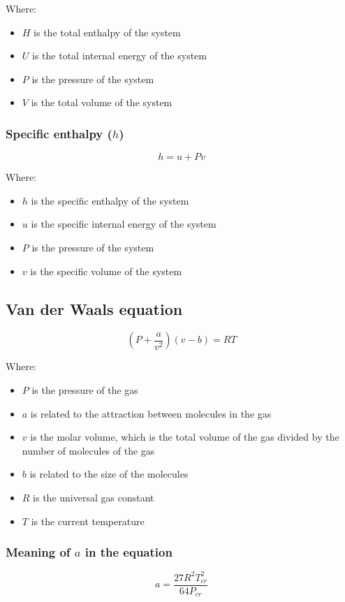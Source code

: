 \documentclass[11pt]{article}
\begin{document}
Where:
\begin{itemize}
\item \(H\) is the total enthalpy of the system
\item \(U\) is the total internal energy of the system
\item \(P\) is the pressure of the system
\item \(V\) is the total volume of the system
\end{itemize}

\subsubsection{Specific enthalpy (\(h\))}
\label{sec:org28ef6c0}
\[h = u + Pv\]

Where:
\begin{itemize}
\item \(h\) is the specific enthalpy of the system
\item \(u\) is the specific internal energy of the system
\item \(P\) is the pressure of the system
\item \(v\) is the specific volume of the system
\end{itemize}

\newpage

\subsection{Van der Waals equation}
\label{sec:org858354c}
\[\left(P + \frac{a}{v^2} \right) \left(v - b \right) = RT\]

Where:
\begin{itemize}
\item \(P\) is the pressure of the gas
\item \(a\) is related to the attraction between molecules in the gas
\item \(v\) is the molar volume, which is the total volume of the gas divided by the number of molecules of the gas
\item \(b\) is related to the size of the molecules
\item \(R\) is the universal gas constant
\item \(T\) is the current temperature
\end{itemize}

\subsubsection{Meaning of \(a\) in the equation}
\label{sec:org6072422}
\[a = \frac{27 R^2 T_{cr}^2}{64 P_{cr}}\]
\end{document}
